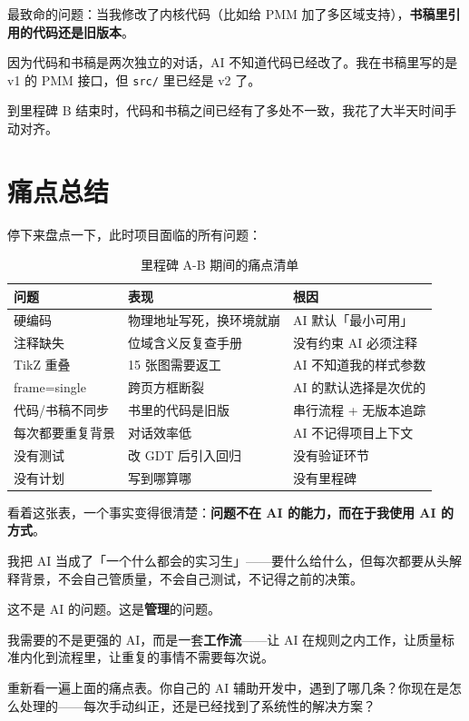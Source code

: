 最致命的问题：当我修改了内核代码（比如给 PMM 加了多区域支持），\textbf{书稿里引用的代码还是旧版本}。

因为代码和书稿是两次独立的对话，AI 不知道代码已经改了。我在书稿里写的是 v1 的 PMM 接口，但 \texttt{src/} 里已经是 v2 了。

到里程碑 B 结束时，代码和书稿之间已经有了多处不一致，我花了大半天时间手动对齐。

\section{痛点总结}

停下来盘点一下，此时项目面临的所有问题：

\begin{table}[H]
\centering
\small
\begin{tabularx}{\textwidth}{lXl}
\toprule
\textbf{问题} & \textbf{表现} & \textbf{根因} \\
\midrule
硬编码 & 物理地址写死，换环境就崩 & AI 默认「最小可用」 \\
注释缺失 & 位域含义反复查手册 & 没有约束 AI 必须注释 \\
TikZ 重叠 & 15 张图需要返工 & AI 不知道我的样式参数 \\
frame=single & 跨页方框断裂 & AI 的默认选择是次优的 \\
代码/书稿不同步 & 书里的代码是旧版 & 串行流程 + 无版本追踪 \\
每次都要重复背景 & 对话效率低 & AI 不记得项目上下文 \\
没有测试 & 改 GDT 后引入回归 & 没有验证环节 \\
没有计划 & 写到哪算哪 & 没有里程碑 \\
\bottomrule
\end{tabularx}
\caption{里程碑 A-B 期间的痛点清单}
\end{table}

看着这张表，一个事实变得很清楚：\textbf{问题不在 AI 的能力，而在于我使用 AI 的方式}。

我把 AI 当成了「一个什么都会的实习生」——要什么给什么，但每次都要从头解释背景，不会自己管质量，不会自己测试，不记得之前的决策。

这不是 AI 的问题。这是\textbf{管理}的问题。

我需要的不是更强的 AI，而是一套\textbf{工作流}——让 AI 在规则之内工作，让质量标准内化到流程里，让重复的事情不需要每次说。

\begin{thinkbox}
重新看一遍上面的痛点表。你自己的 AI 辅助开发中，遇到了哪几条？你现在是怎么处理的——每次手动纠正，还是已经找到了系统性的解决方案？
\end{thinkbox}

